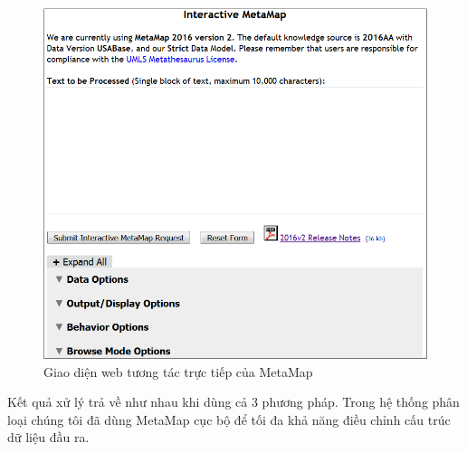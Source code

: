 \begin{figure}[h]
\centering
\includegraphics[scale=0.6]{../hinh/mmweb.png}
\caption{Giao diện web tương tác trực tiếp của MetaMap}
\label{fig:mmweb}
\end{figure}

Kết quả xử lý trả về như nhau khi dùng cả 3 phương pháp. Trong hệ thống phân loại chúng tôi đã dùng MetaMap cục bộ để tối đa khả năng điều chỉnh cấu trúc dữ liệu đầu ra. \\


